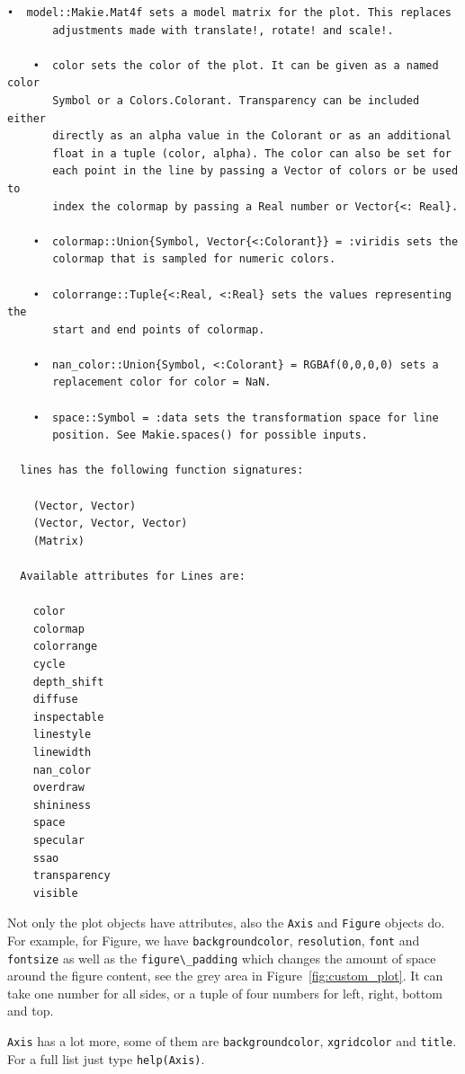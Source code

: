 \documentclass[
  notoc %
]{tufte-book}
\newcommand{\passthrough}[1]{#1}
\begin{document}
\begin{lstlisting}[language=Output]
    •  model::Makie.Mat4f sets a model matrix for the plot. This replaces
       adjustments made with translate!, rotate! and scale!.

    •  color sets the color of the plot. It can be given as a named color
       Symbol or a Colors.Colorant. Transparency can be included either
       directly as an alpha value in the Colorant or as an additional
       float in a tuple (color, alpha). The color can also be set for
       each point in the line by passing a Vector of colors or be used to
       index the colormap by passing a Real number or Vector{<: Real}.

    •  colormap::Union{Symbol, Vector{<:Colorant}} = :viridis sets the
       colormap that is sampled for numeric colors.

    •  colorrange::Tuple{<:Real, <:Real} sets the values representing the
       start and end points of colormap.

    •  nan_color::Union{Symbol, <:Colorant} = RGBAf(0,0,0,0) sets a
       replacement color for color = NaN.

    •  space::Symbol = :data sets the transformation space for line
       position. See Makie.spaces() for possible inputs.

  lines has the following function signatures:

    (Vector, Vector)
    (Vector, Vector, Vector)
    (Matrix)

  Available attributes for Lines are:

    color
    colormap
    colorrange
    cycle
    depth_shift
    diffuse
    inspectable
    linestyle
    linewidth
    nan_color
    overdraw
    shininess
    space
    specular
    ssao
    transparency
    visible
\end{lstlisting}

Not only the plot objects have attributes, also the
\passthrough{\lstinline!Axis!} and \passthrough{\lstinline!Figure!}
objects do. For example, for Figure, we have
\passthrough{\lstinline!backgroundcolor!},
\passthrough{\lstinline!resolution!}, \passthrough{\lstinline!font!} and
\passthrough{\lstinline!fontsize!} as well as the
\passthrough{\lstinline!figure\_padding!} which changes the amount of
space around the figure content, see the grey area in
Figure~\ref{fig:custom_plot}. It can take one number for all sides, or a
tuple of four numbers for left, right, bottom and top.

\passthrough{\lstinline!Axis!} has a lot more, some of them are
\passthrough{\lstinline!backgroundcolor!},
\passthrough{\lstinline!xgridcolor!} and
\passthrough{\lstinline!title!}. For a full list just type
\passthrough{\lstinline!help(Axis)!}.
\end{document}
